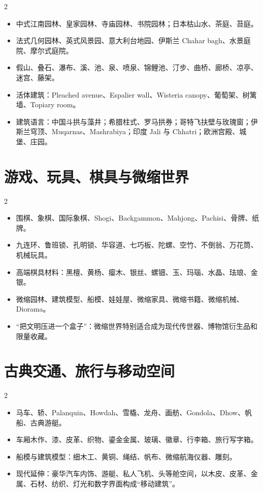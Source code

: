 \documentclass[lang=en,a4paper,11pt]{elegantpaper}
\begin{document}
\begin{multicols}{2}
\begin{itemize}
\item 中式江南园林、皇家园林、寺庙园林、书院园林；日本枯山水、茶庭、苔庭。
\item 法式几何园林、英式风景园、意大利台地园、伊斯兰 Chahar bagh、水景庭院、摩尔式庭院。
\item 假山、叠石、瀑布、溪、池、泉、喷泉、锦鲤池、汀步、曲桥、廊桥、凉亭、迷宫、藤架。
\item 活体建筑：Pleached avenue、Espalier wall、Wisteria canopy、葡萄架、树篱墙、Topiary room。
\item 建筑语言：中国斗拱与藻井；希腊柱式、罗马拱券；哥特飞扶壁与玫瑰窗；伊斯兰穹顶、Muqarnas、Mashrabiya；印度 Jali 与 Chhatri；欧洲宫殿、城堡、庄园。
\end{itemize}
\end{multicols}

\section{游戏、玩具、棋具与微缩世界}


\begin{multicols}{2}
\begin{itemize}
\item 围棋、象棋、国际象棋、Shogi、Backgammon、Mahjong、Pachisi、骨牌、纸牌。
\item 九连环、鲁班锁、孔明锁、华容道、七巧板、陀螺、空竹、不倒翁、万花筒、机械玩具。
\item 高端棋具材料：黑檀、黄杨、瘿木、银丝、螺钿、玉、玛瑙、水晶、珐琅、金银。
\item 微缩园林、建筑模型、船模、娃娃屋、微缩家具、微缩书籍、微缩机械、Diorama。
\item “把文明压进一个盒子”：微缩世界特别适合成为现代传世器、博物馆衍生品和限量收藏。
\end{itemize}
\end{multicols}

\section{古典交通、旅行与移动空间}


\begin{multicols}{2}
\begin{itemize}
\item 马车、轿、Palanquin、Howdah、雪橇、龙舟、画舫、Gondola、Dhow、帆船、古典游艇。
\item 车厢木作、漆、皮革、织物、鎏金金属、玻璃、徽章、行李箱、旅行写字箱。
\item 船模与建筑模型：细木工、黄铜、绳结、帆布、微缩航海仪器、雕刻。
\item 现代延伸：豪华汽车内饰、游艇、私人飞机、头等舱空间，以木皮、皮革、金属、石材、纺织、灯光和数字界面构成“移动建筑”。
\end{itemize}
\end{multicols}
\end{document}

